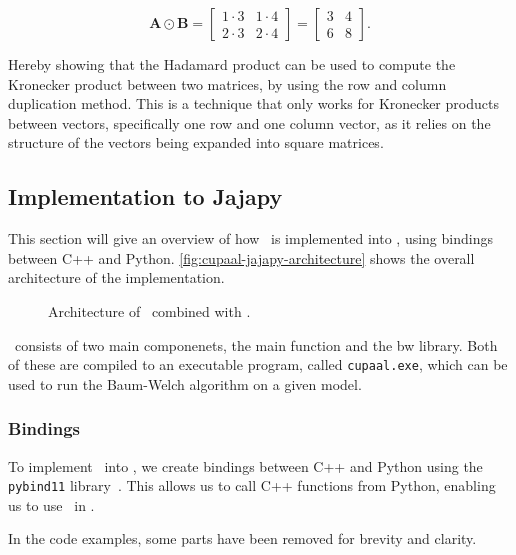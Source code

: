 \begin{equation}
    \mathbf{A} \odot \mathbf{B} = \begin{bmatrix}
        1 \cdot 3 & 1 \cdot 4 \\
        2 \cdot 3 & 2 \cdot 4
    \end{bmatrix} = \begin{bmatrix}
        3 & 4 \\
        6 & 8
    \end{bmatrix}.
\end{equation}


Hereby showing that the Hadamard product can be used to compute the Kronecker product between two matrices, by using the row and column duplication method.
This is a technique that only works for Kronecker products between vectors, specifically one row and one column vector, as it relies on the structure of the vectors being expanded into square matrices.

\subsection{Implementation to Jajapy}\label{subsec:implementation-to-jajapy}
This section will give an overview of how \Cupaal\ is implemented into \Jajapy, using bindings between C++ and Python.
\autoref{fig:cupaal-jajapy-architecture} shows the overall architecture of the implementation.

\begin{figure}[htb!]
    \centering
    
    \caption{Architecture of \Cupaal\ combined with \Jajapy.}
    \label{fig:cupaal-jajapy-architecture}
\end{figure}

\Cupaal\ consists of two main componenets, the main function and the \gls{bw} library.
Both of these are compiled to an executable program, called \texttt{cupaal.exe}, which can be used to run the Baum-Welch algorithm on a given model.

\subsubsection{Bindings}\label{subsubsec:bindings}
To implement \Cupaal\ into \Jajapy, we create bindings between C++ and Python using the \texttt{pybind11} library~\cite{pybind11github}.
This allows us to call C++ functions from Python, enabling us to use \Cupaal\ in \Jajapy.

In the code examples, some parts have been removed for brevity and clarity.


